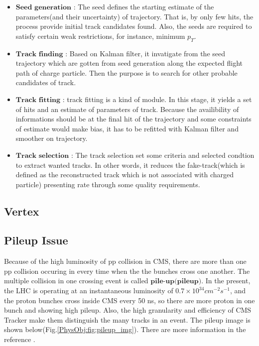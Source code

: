 		\begin{itemize}
			\item $\textbf{Seed generation}$ : The seed defines the starting estimate of the parameters(and their uncertainty) of trajectory. That is, by only few hits, the process provide initial track candidates found. Also, the seeds are required to satisfy certain weak restrictions, for instance, minimum $p_T$.
			\item $\textbf{Track finding}$ : Based on Kalman filter, it invatigate from the seed trajectory which are gotten from seed generation along the expected flight path of charge particle. Then the purpose is to search for other probable candidates of track.
			\item $\textbf{Track fitting}$ : track fitting is a kind of module. In this stage, it yields a set of hits and an estimate of parameters of track. Because the availibility of informations should be at the final hit of the trajectory and some constraints of estimate would make bias, it has to be refitted with Kalman filter and smoother on trajectory.
			\item $\textbf{Track selection}$ : The track selection set some criteria and selected condtion to extract wanted tracks. In other words, it reduces the fake-track(which is defined as the reconstructed track which is not associated with charged particle) presenting rate through some quality requirements.
		\label{PhysObj:itm:track_reco}
		\end{itemize}

	\subsection{Vertex}
	\label{ssec:PhysObj_vertex}

		

	\subsection{Pileup Issue}
	\label{ssec:PhysObj_pu}{}

		Because of the high luminosity of pp collision in CMS, there are more than one pp collision occuring in every time when the the bunches cross one another. The multiple collision in one crossing event is called $\textbf{pile-up(pileup)}$. In the present, the LHC is operating at an instantaneous luminosity of $0.7\times10^{34} cm^{-2}s^{-1}$, and the proton bunches cross inside CMS every 50 ns, so there are more proton in one bunch and showing high pileup. Also, the high granularity and efficiency of CMS Tracker make them distinguish the many tracks in an event. The pileup image is shown below(Fig.\ref{PhysObj:fig:pileup_img}). There are more information in the reference \cite{Pileup_page}.

